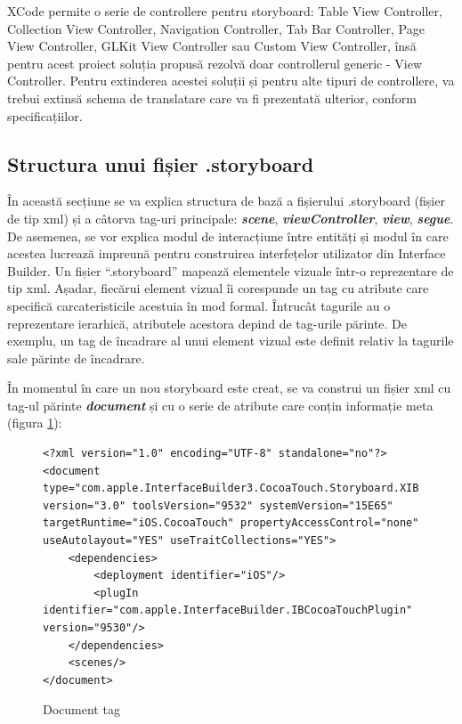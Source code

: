 XCode permite o serie de controllere pentru storyboard: Table View Controller, Collection View Controller, Navigation Controller, Tab Bar Controller, Page View Controller, GLKit View Controller sau Custom View Controller, însă pentru acest proiect soluția propusă rezolvă doar controllerul generic - View Controller. Pentru extinderea acestei soluții și pentru alte tipuri de controllere, va trebui extinsă schema de translatare care va fi prezentată ulterior, conform specificațiilor.

\subsection{Structura unui fișier .storyboard}

În această secțiune se va explica structura de bază a fișierului .storyboard (fișier de tip xml) și a câtorva tag-uri principale: \textbf{\textit{scene}}, \textbf{\textit{viewController}}, \textbf{\textit{view}}, \textbf{\textit{segue}}. De asemenea, se vor explica modul de interacțiune între entități și modul în care acestea lucrează impreună pentru construirea interfețelor utilizator din Interface Builder.
Un fișier “.storyboard” mapează elementele vizuale într-o reprezentare de tip xml. Așadar, fiecărui element vizual îi corespunde un tag cu atribute care specifică carcateristicile acestuia în mod formal. Întrucât tagurile au o reprezentare ierarhică, atributele acestora depind de tag-urile părinte. De exemplu, un tag de încadrare al unui element vizual este definit relativ la tagurile sale părinte de încadrare.

În momentul în care un nou storyboard este creat, se va construi un fișier xml cu tag-ul părinte \textbf{\textit{document}} și cu o serie de atribute care conțin informație meta (figura \ref{fig:document}):

\begin{figure}[!htbp]
\lstset{language=XML}
\begin{lstlisting}
<?xml version="1.0" encoding="UTF-8" standalone="no"?>
<document type="com.apple.InterfaceBuilder3.CocoaTouch.Storyboard.XIB" version="3.0" toolsVersion="9532" systemVersion="15E65" targetRuntime="iOS.CocoaTouch" propertyAccessControl="none" useAutolayout="YES" useTraitCollections="YES">
    <dependencies>
        <deployment identifier="iOS"/>
        <plugIn identifier="com.apple.InterfaceBuilder.IBCocoaTouchPlugin" version="9530"/>
    </dependencies>
    <scenes/>
</document>
\end{lstlisting}
\caption{Document tag}\label{fig:document}
\end{figure}

